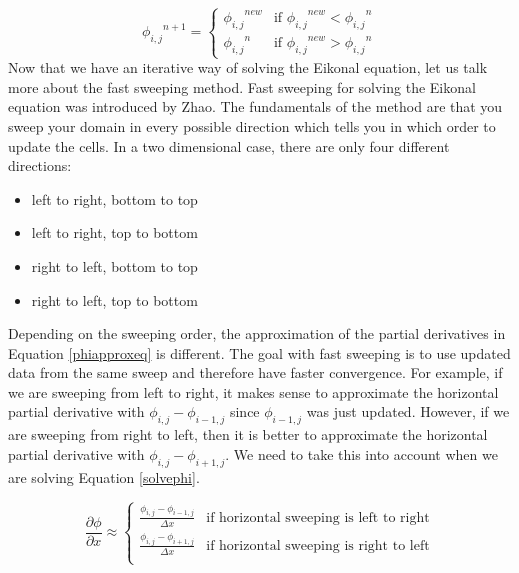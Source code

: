 \begin{equation}
{\phi_{i,j}}^{n+1} = 
\left\{
\begin{array}{ll}
{\phi_{i,j}}^{new} & \mbox{if ${\phi_{i,j}}^{new} < {\phi_{i,j}}^{n}$} \\
{\phi_{i,j}}^{n} & \mbox{if ${\phi_{i,j}}^{new} > {\phi_{i,j}}^{n}$}
\end{array}
\right.
\end{equation}
\noindent
Now that we have an iterative way of solving the Eikonal equation, let us talk more about the fast sweeping method. Fast sweeping for solving the Eikonal equation was introduced by Zhao\cite{zhao}. The fundamentals of the method are that you sweep your domain in every possible direction which tells you in which order to update the cells. In a two dimensional case, there are only four different directions:

\begin{itemize}
\item left to right, bottom to top
\item left to right, top to bottom
\item right to left, bottom to top
\item right to left, top to bottom
\end{itemize}
\noindent
Depending on the sweeping order, the approximation of the partial derivatives in Equation \ref{phiapproxeq} is different. The goal with fast sweeping is to use updated data from the same sweep and therefore have faster convergence. For example, if we are sweeping from left to right, it makes sense to approximate the horizontal partial derivative with $\phi_{i,j} - \phi_{i-1,j}$ since $\phi_{i-1,j}$ was just updated. However, if we are sweeping from right to left, then it is better to approximate the horizontal partial derivative with $\phi_{i,j} - \phi_{i+1,j}$. We need to take this into account when we are solving Equation \ref{solvephi}.

\begin{equation}
\frac{\partial \phi}{\partial x} \approx
\left\{
\begin{array}{ll}
\frac{\phi_{i,j} - \phi_{i-1,j}}{\Delta x} & \mbox{if horizontal sweeping is left to right} \\
\frac{\phi_{i,j} - \phi_{i+1,j}}{\Delta x} & \mbox{if horizontal sweeping is right to left} \\
\end{array}
\right.
\end{equation}

